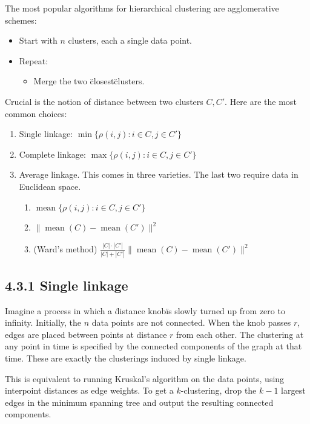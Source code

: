 \documentclass{article}
\begin{document}
The most popular algorithms for hierarchical clustering are agglomerative schemes:

\begin{itemize}
    \item Start with $n$ clusters, each a single data point.
    \item Repeat:
    \begin{itemize}
        \item Merge the two \"closest\" clusters.
    \end{itemize}
\end{itemize}

Crucial is the notion of distance between two clusters $C, C'$. Here are the most common choices:

\begin{enumerate}
    \item Single linkage: $\min \{\rho(i, j): i \in C, j \in C'\}$
    \item Complete linkage: $\max \{\rho(i, j): i \in C, j \in C'\}$
    \item Average linkage. This comes in three varieties. The last two require data in Euclidean space.
    \begin{enumerate}
        \item $\operatorname{mean} \{\rho(i, j): i \in C, j \in C'\}$
        \item $\|\operatorname{mean}(C) - \operatorname{mean}(C')\|^{2}$
        \item (Ward's method) $\frac{|C| \cdot |C'|}{|C| + |C'|} \|\operatorname{mean}(C) - \operatorname{mean}(C')\|^{2}$
    \end{enumerate}
\end{enumerate}

\subsection*{4.3.1 Single linkage}

Imagine a process in which a \"distance knob\" is slowly turned up from zero to infinity. Initially, the $n$ data points are not connected. When the knob passes $r$, edges are placed between points at distance $r$ from each other. The clustering at any point in time is specified by the connected components of the graph at that time. These are exactly the clusterings induced by single linkage.

This is equivalent to running Kruskal's algorithm on the data points, using interpoint distances as edge weights. To get a $k$-clustering, drop the $k-1$ largest edges in the minimum spanning tree and output the resulting connected components.
\end{document}
